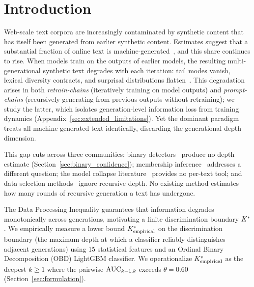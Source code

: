 \section{Introduction}
\label{sec:introduction}

Web-scale text corpora are increasingly contaminated by synthetic content that has itself been generated from earlier synthetic content.
Estimates suggest that a substantial fraction of online text is machine-generated~\cite{sun2025aigt, spennemann2025quantifying}, and this share continues to rise.
When models train on the outputs of earlier models, the resulting multi-generational synthetic text degrades with each iteration: tail modes vanish, lexical diversity contracts, and surprisal distributions flatten~\cite{shumailov2024collapse, dohmatob2024model}.
This degradation arises in both \emph{retrain-chains} (iteratively training on model outputs) and \emph{prompt-chains} (recursively generating from previous outputs without retraining); we study the latter, which isolates generation-level information loss from training dynamics (Appendix~\ref{sec:extended_limitations}).
Yet the dominant paradigm treats all machine-generated text identically, discarding the generational depth dimension.

This gap cuts across three communities: binary detectors~\cite{basani2026diveye, zhang2024minkpp} produce no depth estimate (Section~\ref{sec:binary_confidence}); membership inference~\cite{zawalski2026codec} addresses a different question; the model collapse literature~\cite{shumailov2024collapse, alemohammad2024selfconsuming, schaeffer2025position} provides no per-text tool; and data selection methods~\cite{xie2023dsir, tirumala2023d4, drayson2025} ignore recursive depth.
No existing method estimates how many rounds of recursive generation a text has undergone.

The Data Processing Inequality guarantees that information degrades monotonically across generations, motivating a finite discrimination boundary ${K^*}$.
We empirically measure a lower bound ${K^*_{\text{empirical}}}$ on the discrimination boundary (the maximum depth at which a classifier reliably distinguishes adjacent generations) using 15 statistical features and an Ordinal Binary Decomposition (OBD) LightGBM classifier.
We operationalize ${K^*_{\text{empirical}}}$ as the deepest $k \geq 1$ where the pairwise $\text{AUC}_{k-1,k}$ exceeds $\theta = 0.60$ (Section~\ref{sec:formulation}).

